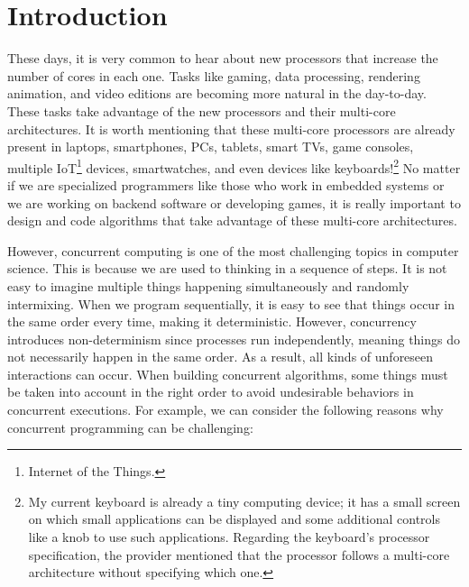 \chapter{\label{chapter:1_Introduction}Introduction}

These days, it is very common to hear about new processors that increase the number of cores in each one. Tasks like gaming, data processing, rendering animation, and video editions are becoming more natural in the day-to-day. These tasks take advantage of the new processors and their multi-core architectures. It is worth mentioning that these multi-core processors are already present in laptops, smartphones, PCs, tablets, smart TVs, game consoles, multiple IoT\footnote{Internet of the Things.} devices, smartwatches, and even devices like keyboards!\footnote{My current keyboard is already a tiny computing device; it has a small screen on which small applications can be displayed and some additional controls like a knob to use such applications. Regarding the keyboard's processor specification, the provider mentioned that the processor follows a multi-core architecture without specifying which one.} No matter if we are specialized programmers like those who work in embedded systems or we are working on backend software or developing games, it is really important to design and code algorithms that take advantage of these multi-core architectures.

However, concurrent computing is one of the most challenging topics in computer science. This is because we are used to thinking in a sequence of steps. It is not easy to imagine multiple things happening simultaneously and randomly intermixing. When we program sequentially, it is easy to see that things occur in the same order every time, making it deterministic. However, concurrency introduces non-determinism since processes run independently, meaning things do not necessarily happen in the same order. As a result, all kinds of unforeseen interactions can occur. When building concurrent algorithms, some things must be taken into account in the right order to avoid undesirable behaviors in concurrent executions. For example, we can consider the following reasons why concurrent programming can be challenging:

